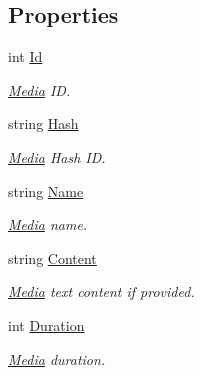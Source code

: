 \subsection*{Properties}
\begin{DoxyCompactItemize}
\item 
int \hyperlink{class_thecallr_api_1_1_objects_1_1_media_1_1_media_library_a96225807000e05b1ba6726a8b8f4617e}{Id}
\begin{DoxyCompactList}\small\item\em \hyperlink{namespace_thecallr_api_1_1_objects_1_1_media}{Media} I\+D. \end{DoxyCompactList}\item 
string \hyperlink{class_thecallr_api_1_1_objects_1_1_media_1_1_media_library_a4d9c7a546db06d691af374470e7a83be}{Hash}
\begin{DoxyCompactList}\small\item\em \hyperlink{namespace_thecallr_api_1_1_objects_1_1_media}{Media} Hash I\+D. \end{DoxyCompactList}\item 
string \hyperlink{class_thecallr_api_1_1_objects_1_1_media_1_1_media_library_ac7d3e1a5654d0f64d19d680d0443a633}{Name}
\begin{DoxyCompactList}\small\item\em \hyperlink{namespace_thecallr_api_1_1_objects_1_1_media}{Media} name. \end{DoxyCompactList}\item 
string \hyperlink{class_thecallr_api_1_1_objects_1_1_media_1_1_media_library_a6dd097f204166d9489e5bd28d67849be}{Content}
\begin{DoxyCompactList}\small\item\em \hyperlink{namespace_thecallr_api_1_1_objects_1_1_media}{Media} text content if provided. \end{DoxyCompactList}\item 
int \hyperlink{class_thecallr_api_1_1_objects_1_1_media_1_1_media_library_a9a4b62eb05010a5b2e277a17ff51eeb8}{Duration}
\begin{DoxyCompactList}\small\item\em \hyperlink{namespace_thecallr_api_1_1_objects_1_1_media}{Media} duration. \end{DoxyCompactList}\item 

\end{DoxyCompactItemize}
